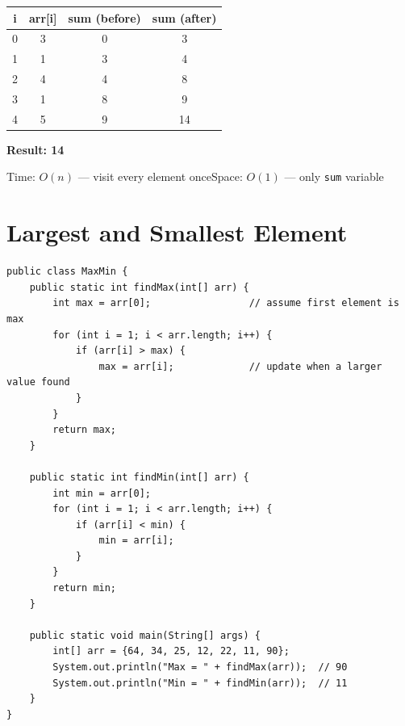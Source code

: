 \documentclass[12pt,a4paper,oneside]{book}
\begin{document}
\begin{dryrun}[Dry Run: arr = \{3, 1, 4, 1, 5\}]
\begin{center}
\begin{tabular}{cccc}
\toprule
\textbf{i} & \textbf{arr[i]} & \textbf{sum (before)} & \textbf{sum (after)}\\
\midrule
0 & 3 & 0  & 3\\
1 & 1 & 3  & 4\\
2 & 4 & 4  & 8\\
3 & 1 & 8  & 9\\
4 & 5 & 9  & 14\\
\bottomrule
\end{tabular}
\end{center}
\textbf{Result: 14}
\end{dryrun}

\begin{complexity}
Time: $O(n)$ --- visit every element once\quad Space: $O(1)$ --- only \texttt{sum} variable
\end{complexity}

\section{Largest and Smallest Element}

\begin{lstlisting}[caption={Find Max and Min in a single pass each}]
public class MaxMin {
    public static int findMax(int[] arr) {
        int max = arr[0];                 // assume first element is max
        for (int i = 1; i < arr.length; i++) {
            if (arr[i] > max) {
                max = arr[i];             // update when a larger value found
            }
        }
        return max;
    }

    public static int findMin(int[] arr) {
        int min = arr[0];
        for (int i = 1; i < arr.length; i++) {
            if (arr[i] < min) {
                min = arr[i];
            }
        }
        return min;
    }

    public static void main(String[] args) {
        int[] arr = {64, 34, 25, 12, 22, 11, 90};
        System.out.println("Max = " + findMax(arr));  // 90
        System.out.println("Min = " + findMin(arr));  // 11
    }
}
\end{lstlisting}
\end{document}
